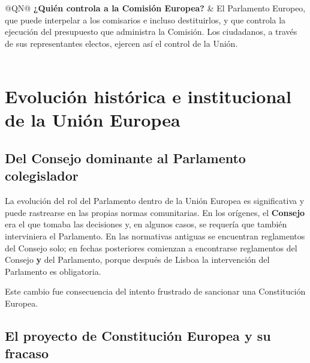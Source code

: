 \documentclass[12pt,oneside]{book}
\begin{document}
\begin{longtable}{@{}QN@{}}
\textbf{¿Quién controla a la Comisión Europea?} &
El Parlamento Europeo, que puede interpelar a los comisarios e incluso destituirlos, y que controla la ejecución del presupuesto que administra la Comisión. Los ciudadanos, a través de sus representantes electos, ejercen así el control de la Unión. \\

\midrule
{} \\
\bottomrule
\end{longtable}

\chapter[Evolución histórica e institucional]{Evolución histórica e institucional de la Unión Europea}

\section{Del Consejo dominante al Parlamento colegislador}

La evolución del rol del Parlamento dentro de la Unión Europea es significativa y puede rastrearse en las propias normas comunitarias. En los orígenes, el \textbf{Consejo} era el que tomaba las decisiones y, en algunos casos, se requería que también interviniera el Parlamento. En las normativas antiguas se encuentran reglamentos del Consejo solo; en fechas posteriores comienzan a encontrarse reglamentos del Consejo \textbf{y} del Parlamento, porque después de Lisboa la intervención del Parlamento es obligatoria.

Este cambio fue consecuencia del intento frustrado de sancionar una Constitución Europea.

\section{El proyecto de Constitución Europea y su fracaso}
\end{document}
